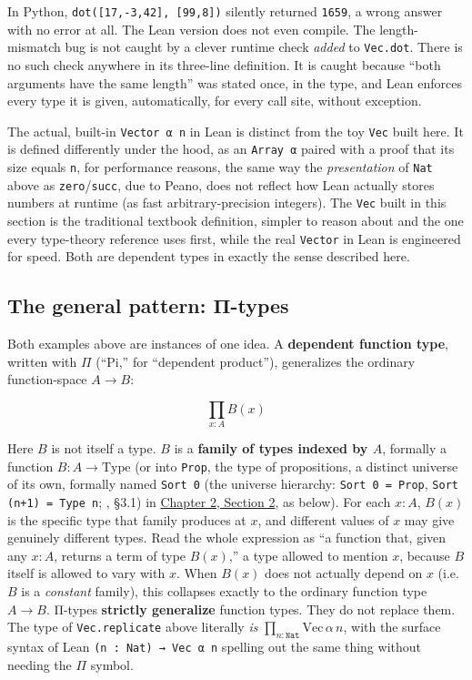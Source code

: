 In Python, \texttt{dot([17,-\allowbreak{}3,42], [99,8])} silently returned \texttt{1659}, a wrong answer with no error at all. The Lean version does not even compile. The length-mismatch bug is not caught by a clever runtime check \emph{added} to \texttt{Vec.dot}. There is no such check anywhere in its three-line definition. It is caught because ``both arguments have the same length'' was stated once, in the type, and Lean enforces every type it is given, automatically, for every call site, without exception.

The actual, built-in \texttt{Vector α n} in Lean is distinct from the toy \texttt{Vec} built here. It is defined differently under the hood, as an \texttt{Array α} paired with a proof that its size equals \texttt{n}, for performance reasons, the same way the \emph{presentation} of \texttt{Nat} above as \texttt{zero}/\texttt{succ}, due to Peano, does not reflect how Lean actually stores numbers at runtime (as fast arbitrary-precision integers). The \texttt{Vec} built in this section is the traditional textbook definition, simpler to reason about and the one every type-theory reference uses first, while the real \texttt{Vector} in Lean is engineered for speed. Both are dependent types in exactly the sense described here.

\subsection{The general pattern: Π-types}\label{sec:01-basics:03-dependent-types:7}

Both examples above are instances of one idea. A \textbf{dependent function type}, written with \(\Pi\) (``Pi,'' for ``dependent product''), generalizes the ordinary function-space \(A \to B\):

\[
\prod_{x : A} B(x)
\]

Here \(B\) is not itself a type. \(B\) is a \textbf{family of types indexed by \(A\)}, formally a function \(B : A \to \mathrm{Type}\) (or into \texttt{Prop}, the type of propositions, a distinct universe of its own, formally named \texttt{Sort 0} (the universe hierarchy: \texttt{Sort 0 = Prop}, \texttt{Sort (n+1) = Type n}; \cite{TPIL4}, §3.1) in \hyperref[sec:02-terminology-and-coc:02-pi-sigma-and-coc:1]{Chapter 2, Section 2}, as below). For each \(x : A\), \(B(x)\) is the specific type that family produces at \(x\), and different values of \(x\) may give genuinely different types. Read the whole expression as ``a function that, given any \(x : A\), returns a term of type \(B(x)\),'' a type allowed to mention \(x\), because \(B\) itself is allowed to vary with \(x\). When \(B(x)\) does not actually depend on \(x\) (i.e.~\(B\) is a \emph{constant} family), this collapses exactly to the ordinary function type \(A \to B\). Π-types \textbf{strictly generalize} function types. They do not replace them. The type of \texttt{Vec.replicate} above literally \emph{is} \(\prod_{n : \mathtt{Nat}} \mathrm{Vec}\,\alpha\,n\), with the surface syntax of Lean \texttt{(n : Nat) → Vec α n} spelling out the same thing without needing the \(\Pi\) symbol.

